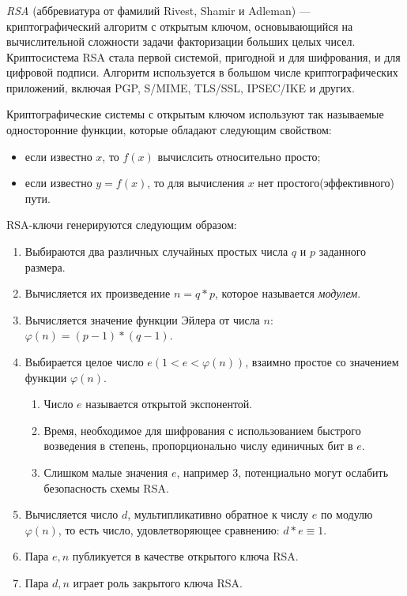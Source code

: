 \subsubsection{}
\label{sec:analysis:research:crypto:rsa}

\emph{RSA} (аббревиатура от фамилий Rivest, Shamir и Adleman) — криптографический алгоритм с открытым ключом, основывающийся на вычислительной сложности задачи факторизации больших целых чисел. Криптосистема RSA стала первой системой, пригодной и для шифрования, и для цифровой подписи. Алгоритм используется в большом числе криптографических приложений, включая PGP, S/MIME, TLS/SSL, IPSEC/IKE и других. \cite{wiki:rsa}

Криптографические системы с открытым ключом используют так называемые односторонние функции, которые обладают следующим свойством:
\begin{itemize}
	\item если известно \(x\), то \(f(x)\) вычислсить относительно просто;
	\item если известно \(y=f(x)\), то для вычисления \(x\) нет простого(эффективного) пути.
\end{itemize}

RSA-ключи генерируются следующим образом:
\begin{enumerate}
	\item Выбираются два различных случайных простых числа \(q\) и \(p\) заданного размера.
	\item Вычисляется их произведение \(n=q*p\), которое называется \emph{модулем}.
	\item Вычисляется значение функции Эйлера от числа \(n\): \(\varphi(n)=(p-1)*(q-1)\).
	\item Выбирается целое число \(e (1 < e < \varphi(n))\), взаимно простое со значением функции \(\varphi(n)\).
	\begin{enumerate}
		\item Число \(e\) называется открытой экспонентой.
		\item Время, необходимое для шифрования с использованием быстрого возведения в степень, пропорционально числу единичных бит в \(e\).
		\item Слишком малые значения \(e\), например 3, потенциально могут ослабить безопасность схемы RSA.
	\end{enumerate}
	\item Вычисляется число \(d\), мультипликативно обратное к числу \(e\) по модулю  \(\varphi(n)\), то есть число, удовлетворяющее сравнению: \(d*e \equiv 1\).
	\item Пара \({e,n}\) публикуется в качестве открытого ключа RSA.
	\item Пара \({d,n}\)  играет роль закрытого ключа RSA.
\end{enumerate}

